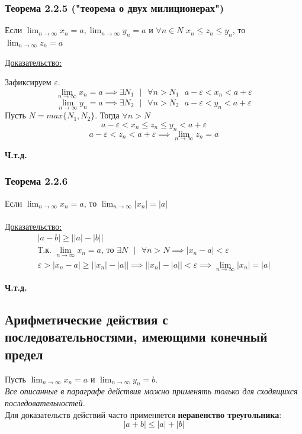 \documentclass[12pt]{article}
\begin{document}
    \subsubsection*{Теорема 2.2.5 ("теорема о двух милиционерах")}\label{th:2.2.5}
    Если $\lim_{n\to\infty} x_n = a, \lim_{n\to\infty} y_n = a$ и $\forall n \in N$ $x_n \le z_{n} \le y_n$, то $\lim_{n\to\infty} z_{n} = a$\par\noindent
    \underline{Доказательство:}
    \begin{adjustwidth}{1.5em}{1.5em}
        Зафиксируем $\varepsilon$.\\
        \[\lim_{n\to\infty} x_n = a \implies \exists N_{1} \text{ } \big| \text{ } \forall n > N_{1} \text{ } a-\varepsilon < x_n < a + \varepsilon\]
        \[\lim_{n\to\infty} y_n = a \implies \exists N_{2} \text{ } \big| \text{ } \forall n > N_{2} \text{ } a-\varepsilon < y_n < a + \varepsilon\]
        Пусть $N = max\{N_{1}, N_{2}\}$. Тогда $\forall n > N$
        \[a-\varepsilon < x_n \le z_{n} \le y_n < a + \varepsilon\]
        \[a - \varepsilon < z_{n} < a + \varepsilon \implies \lim_{n\to\infty} z_{n} = a\]
        \begin{center}
            \textbf{Ч.т.д.}
        \end{center}
    \end{adjustwidth}

    \subsubsection*{Теорема 2.2.6}\label{th:2.2.6}
    Если $\lim_{n\to\infty} x_n = a$, то $\lim_{n\to\infty} |x_n| = |a|$\\\\
    \underline{Доказательство:} 
    \begin{gather*}
        |a-b| \ge \big||a|-|b|\big|\\
        \text{Т.к. } \lim_{n\to\infty} x_n = a \text{, то } \exists N \text{ } \big| \text{ } \forall n > N \implies |x_n - a| < \varepsilon\\
        \varepsilon > |x_n - a| \ge \big||x_n| - |a|\big| \implies \big||x_n| - |a|\big| < \varepsilon \implies \lim_{n\to\infty}|x_n| = |a|
    \end{gather*}
    \begin{center}
        \textbf{Ч.т.д.}
    \end{center}

    \subsection{Арифметические действия с последовательностями, имеющими конечный предел}
    \noindent Пусть $\lim_{n\to\infty}x_n = a$ и $\lim_{n\to\infty}y_n=b$.\\
    \textit{Все описанные в параграфе действия можно применять только для сходящихся последовательностей.}\\
    Для доказательств действий часто применяется \textbf{неравенство треугольника}:
    \[|a+b| \le |a| + |b|\]
\end{document}
